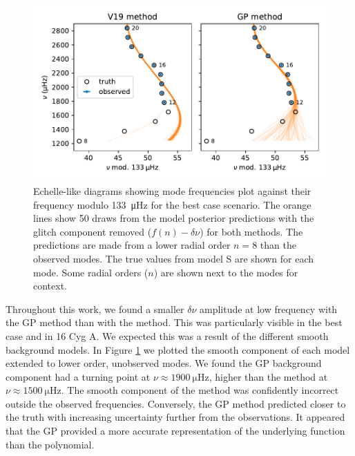 \begin{figure}[tb]
    \centering
    \includegraphics{figures/glitch-test-smooth.pdf}
    \caption[Echelle-like diagrams showing mode frequencies plot against their frequency modulo \SI{133}{\micro\hertz} for the best case scenario.]{Echelle-like diagrams showing mode frequencies plot against their frequency modulo \SI{133}{\micro\hertz} for the best case scenario. The orange lines show 50 draws from the model posterior predictions with the glitch component removed (\(f(n) - \delta\nu\)) for both methods. The predictions are made from a lower radial order \(n=8\) than the observed modes. The true values from model S are shown for each mode. Some radial orders (\(n\)) are shown next to the modes for context.}
    \label{fig:best-smooth}
\end{figure}

Throughout this work, we found a smaller \(\delta\nu\) amplitude at low frequency with the GP method than with the  method. This was particularly visible in the best case and in 16 Cyg A. We expected this was a result of the different smooth background models. In Figure \ref{fig:best-smooth} we plotted the smooth component of each model extended to lower order, unobserved modes. We found the GP background component had a turning point at \(\nu \approx \SI{1900}{\micro\hertz}\), higher than the  method at \(\nu \approx \SI{1500}{\micro\hertz}\). The smooth component of the  method was confidently incorrect outside the observed frequencies. Conversely, the GP method predicted closer to the truth with increasing uncertainty further from the observations. It appeared that the GP provided a more accurate representation of the underlying function than the polynomial.

